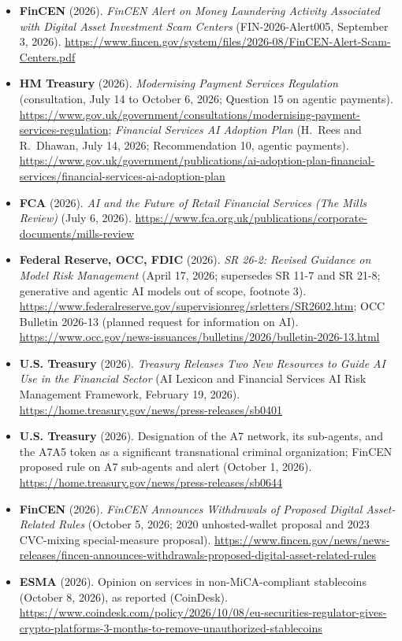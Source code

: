 \documentclass[11pt,letterpaper]{article}
\begin{document}
\begin{itemize}[leftmargin=1.5em]
  \item \textbf{FinCEN} (2026). \textit{FinCEN Alert on Money Laundering Activity Associated with Digital Asset Investment Scam Centers} (FIN-2026-Alert005, September 3, 2026). \url{https://www.fincen.gov/system/files/2026-08/FinCEN-Alert-Scam-Centers.pdf}
  \item \textbf{HM Treasury} (2026). \textit{Modernising Payment Services Regulation} (consultation, July 14 to October 6, 2026; Question 15 on agentic payments). \url{https://www.gov.uk/government/consultations/modernising-payment-services-regulation}; \textit{Financial Services AI Adoption Plan} (H.\ Rees and R.\ Dhawan, July 14, 2026; Recommendation 10, agentic payments). \url{https://www.gov.uk/government/publications/ai-adoption-plan-financial-services/financial-services-ai-adoption-plan}
  \item \textbf{FCA} (2026). \textit{AI and the Future of Retail Financial Services (The Mills Review)} (July 6, 2026). \url{https://www.fca.org.uk/publications/corporate-documents/mills-review}
  \item \textbf{Federal Reserve, OCC, FDIC} (2026). \textit{SR 26-2: Revised Guidance on Model Risk Management} (April 17, 2026; supersedes SR 11-7 and SR 21-8; generative and agentic AI models out of scope, footnote 3). \url{https://www.federalreserve.gov/supervisionreg/srletters/SR2602.htm}; OCC Bulletin 2026-13 (planned request for information on AI). \url{https://www.occ.gov/news-issuances/bulletins/2026/bulletin-2026-13.html}
  \item \textbf{U.S. Treasury} (2026). \textit{Treasury Releases Two New Resources to Guide AI Use in the Financial Sector} (AI Lexicon and Financial Services AI Risk Management Framework, February 19, 2026). \url{https://home.treasury.gov/news/press-releases/sb0401}
  \item \textbf{U.S. Treasury} (2026). Designation of the A7 network, its sub-agents, and the A7A5 token as a significant transnational criminal organization; FinCEN proposed rule on A7 sub-agents and alert (October 1, 2026). \url{https://home.treasury.gov/news/press-releases/sb0644}
  \item \textbf{FinCEN} (2026). \textit{FinCEN Announces Withdrawals of Proposed Digital Asset-Related Rules} (October 5, 2026; 2020 unhosted-wallet proposal and 2023 CVC-mixing special-measure proposal). \url{https://www.fincen.gov/news/news-releases/fincen-announces-withdrawals-proposed-digital-asset-related-rules}
  \item \textbf{ESMA} (2026). Opinion on services in non-MiCA-compliant stablecoins (October 8, 2026), as reported (CoinDesk). \url{https://www.coindesk.com/policy/2026/10/08/eu-securities-regulator-gives-crypto-platforms-3-months-to-remove-unauthorized-stablecoins}

\end{itemize}
\end{document}
